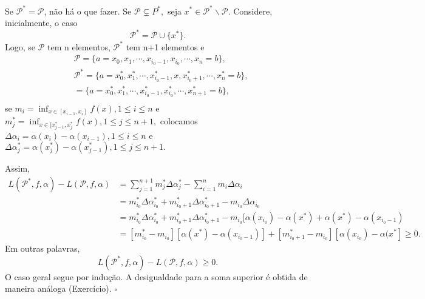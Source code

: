 \documentclass[Analysis/analysis_notes.tex]{subfiles}
\begin{document}
 \begin{proof*}
  Se \(\mathcal{P}^{*} = \mathcal{P}\), não há o que fazer. Se \(\mathcal{P}\subsetneq{P}^{*},\) seja \(x^{*}\in \mathcal{P}^{*}\backslash \mathcal{P}.\) Considere,
  inicialmente, o caso 
    \[
      \mathcal{P}^{*} = \mathcal{P}\cup\{x^{*}\}.
    \]
  Logo, se \(\mathcal{P}\) tem n elementos, \(\mathcal{P}^{*}\) tem n+1 elementos e 
 \begin{align*}
   &\mathcal{P} = \{a = x_{0}, x_{1}, \cdots, x_{i_{0}-1}, x_{i_{0}}, \cdots, x_{n} = b\},\\
   &\mathcal{P}^{*} = \{a = x_{0}^{*}, x_{1}^{*}, \cdots, x_{i_{0}-1}^{*}, x, x_{i_{0}+1}^{*}, \cdots, x_{n}^{*} = b\},\\
   &=\{a = x_{0}^{*}, x_{1}^{*}, \cdots, x_{i_{0}-1}^{*}, x_{i_{0}}^{*}, \cdots, x_{n+1}^{*} = b\},\\ 
 \end{align*}
 se \(m_{i} = \inf_{x\in[x_{i-1}, x_{i}]}f(x), 1\leq i\leq n\) e \(m_{j}^{*} = \inf_{x\in[x_{j-1}^{*}, x_{j}^{*}}f(x), 1\leq j\leq n+1,\) colocamos
 \(\Delta \alpha_{i} = \alpha (x_{i}) - \alpha (x_{i-1}), 1\leq i\leq n\) e \(\Delta \alpha_{j}^{*} = \alpha (x_{j}^{*}) - \alpha (x_{j-1}^{*}), 1\leq j\leq n+1.\)

 Assim, 
\begin{align*}
  L(\mathcal{P}^{*}, f, \alpha ) - L(\mathcal{P}, f, \alpha ) &= \sum\limits_{j=1}^{n+1}m_{j}^{*}\Delta \alpha_{j}^{*} - \sum\limits_{i=1}^{n}m_{i}\Delta \alpha_{i}\\
                                                              &= m_{i_{0}}^{*}\Delta \alpha_{i_{0}}^{*} + m_{i_{0}+1}^{*}\Delta \alpha _{i_{0}+1}^{*} - m_{i_{0}}\Delta \alpha _{i_{0}}\\
                                                              &= m_{i_{0}}^{*}\Delta \alpha_{i_{0}}^{*} + m_{i_{0}+1}^{*}\Delta \alpha _{i_{0}+1}^{*} - m_{i_{0}}[\alpha (x_{i_{0}}) - \alpha (x^{*})+\alpha (x^{*}) - \alpha (x_{i_{0}-1})\\
                                                              &= [m_{i_{0}}^{*} - m_{i_{0}}][\alpha (x^{*}) - \alpha (x_{i_{0}-1})] + [m_{i_{0}+1}^{*} - m_{i_{0}}][\alpha (x_{i_{0}}) - \alpha (x^{*}]\geq 0.
\end{align*}
Em outras palavras, 
  \[
    L(\mathcal{P}^{*}, f, \alpha ) - L(\mathcal{P}, f, \alpha )\geq 0.
  \]
O caso geral segue por indu\c cão. A desigualdade para a soma superior é obtida de maneira análoga (Exercício). \(\square\)
 \end{proof*}
\end{document}
